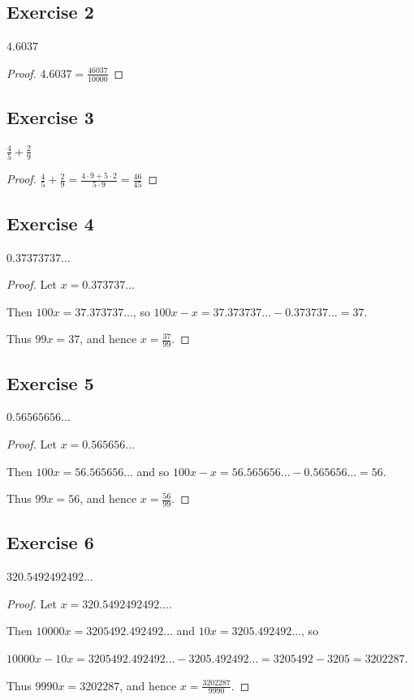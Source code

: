 \documentclass[14pt]{extarticle}
\newcommand{\dps}{\displaystyle}
\begin{document}
\subsection{Exercise 2}
$4.6037$

\begin{proof}
$4.6037 = \frac{46037}{10000}$
\end{proof}

\subsection{Exercise 3}
$\dps\frac{4}{5} + \frac{2}{9}$

\begin{proof}
$\dps\frac{4}{5} + \frac{2}{9} = \frac{4 \cdot 9 + 5 \cdot 2}{5 \cdot 9} = \frac{46}{45}$
\end{proof}

\subsection{Exercise 4}
$0.37373737\ldots$

\begin{proof}
Let $x = 0.373737\ldots$

Then $100x = 37.373737\ldots$, so $100x - x = 37.373737\ldots - 0.373737\ldots = 37$. 

Thus $99x = 37$, and hence $x = \frac{37}{99}$.
\end{proof}

\subsection{Exercise 5}
$0.56565656\ldots$

\begin{proof}
Let $x = 0.565656\ldots$ 

Then $100x = 56.565656\ldots$ and so $100x - x = 56.565656\ldots - 0.565656\ldots = 56$. 

Thus $99x = 56$, and hence $x = \frac{56}{99}$.
\end{proof}

\subsection{Exercise 6}
$320.5492492492\ldots$

\begin{proof}
Let $x = 320.5492492492\ldots$. 

Then $10000x = 3205492.492492\ldots$ and $10x = 3205.492492\ldots$, so 

$10000x - 10x = 3205492.492492 \ldots - 3205.492492\ldots = 3205492 - 3205 = 3202287$. 

Thus $9990x = 3202287$, and hence $x = \frac{3202287}{9990}$.
\end{proof}
\end{document}

